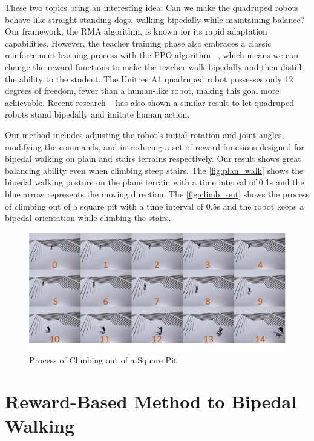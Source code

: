 \documentclass{article} %
\begin{document}
These two topics bring an interesting idea: Can we make the quadruped robots behave like straight-standing dogs, walking bipedally while maintaining balance? Our framework, the RMA algorithm, is known for its rapid adaptation capabilities. However, the teacher training phase also embraces a classic reinforcement learning process with the PPO algorithm ~\citep{schulman2017proximal}, which means we can change the reward functions to make the teacher walk bipedally and then distill the ability to the student. The Unitree A1 quadruped robot possesses only 12 degrees of freedom, fewer than a human-like robot, making this goal more achievable. Recent research ~\citep{li2024learning} has also shown a similar result to let quadruped robots stand bipedally and imitate human action.


Our method includes adjusting the robot's initial rotation and joint angles, modifying the commands, and introducing a set of reward functions designed for bipedal walking on plain and stairs terrains respectively. Our result shows great balancing ability even when climbing steep stairs. The \autoref{fig:plan_walk} shows the bipedal walking posture on the plane terrain with a time interval of 0.1s and the blue arrow represents the moving direction. The \autoref{fig:climb_out} shows the process of climbing out of a square pit with a time interval of 0.5s and the robot keeps a bipedal orientation while climbing the stairs.

\begin{figure}[H]
   \centering
   \includegraphics[width=1.0\textwidth]{climb_out.pdf}
   \caption{Process of Climbing out of a Square Pit}
   \label{fig:climb_out}
\end{figure}



\section{Reward-Based Method to Bipedal Walking}
\end{document}
